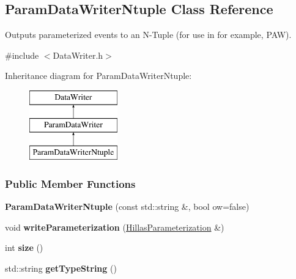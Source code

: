 \hypertarget{classParamDataWriterNtuple}{
\subsection{ParamDataWriterNtuple Class Reference}
\label{classParamDataWriterNtuple}
}


Outputs parameterized events to an N-\/Tuple (for use in for example, PAW).  




{\ttfamily \#include $<$DataWriter.h$>$}

Inheritance diagram for ParamDataWriterNtuple:\begin{figure}[H]
\begin{center}
\leavevmode
\includegraphics[height=3.000000cm]{classParamDataWriterNtuple}
\end{center}
\end{figure}
\subsubsection*{Public Member Functions}
\begin{DoxyCompactItemize}
\item 
\hypertarget{classParamDataWriterNtuple_a5059611c758f6e6d12b3b31695de0273}{
{\bfseries ParamDataWriterNtuple} (const std::string \&, bool ow=false)}
\label{classParamDataWriterNtuple_a5059611c758f6e6d12b3b31695de0273}

\item 
\hypertarget{classParamDataWriterNtuple_a30e0580d54b007e124dad177cbb367ea}{
void {\bfseries writeParameterization} (\hyperlink{structHillasParameterization}{HillasParameterization} \&)}
\label{classParamDataWriterNtuple_a30e0580d54b007e124dad177cbb367ea}

\item 
\hypertarget{classParamDataWriterNtuple_a8dfa88860127d9b8dbb8537377b4f3e2}{
int {\bfseries size} ()}
\label{classParamDataWriterNtuple_a8dfa88860127d9b8dbb8537377b4f3e2}

\item 
\hypertarget{classParamDataWriterNtuple_a26514c9a723f660f89281fa21cd07c63}{
std::string {\bfseries getTypeString} ()}
\label{classParamDataWriterNtuple_a26514c9a723f660f89281fa21cd07c63}

\end{DoxyCompactItemize}


